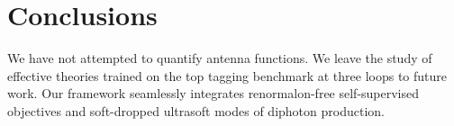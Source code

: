 \section{Conclusions}\label{sec:conclusions}

We have not attempted to quantify antenna functions. We leave the study
of effective theories trained on the top tagging benchmark at three
loops to future work. Our framework seamlessly integrates
renormalon-free self-supervised objectives and soft-dropped ultrasoft
modes of diphoton production.

